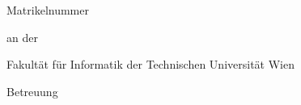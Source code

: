 \begin{center}
%
\begin{minipage}[t][5.2cm][b]{\linewidth}%
    \centering%
    \thesistitlefontHUGE\sffamily\bfseries\tuinfthesistitle%
\end{minipage}


\vspace{1.3cm}

{\thesistitlefontLARGE\sffamily \tuinfthesistype}

\vspace{6mm}


\vspace{6mm}


\vspace{6mm}


\vspace{6mm}


\vspace{6.5mm}


\vspace{6mm}

{\thesistitlefontLarge\sffamily\bfseries \tuinfthesisauthor}

\vspace{1.5mm}

{\thesistitlefontlarge\sffamily Matrikelnummer \tuinfthesismatrikelno} 

\vspace{1.5cm}

\begin{minipage}[t][1.7cm][t]{\textwidth}%
  \vspace{0pt}\raggedright\thesistitlefontnormalsize\sffamily
  an der

  Fakult\"{a}t f\"{u}r Informatik der Technischen Universit\"{a}t Wien
\end{minipage}

\begin{minipage}[t][4cm][t]{\textwidth}%
  \vspace{0pt}\sffamily\thesistitlefontnormalsize\raggedright
  Betreuung


\end{minipage}
\end{center}
